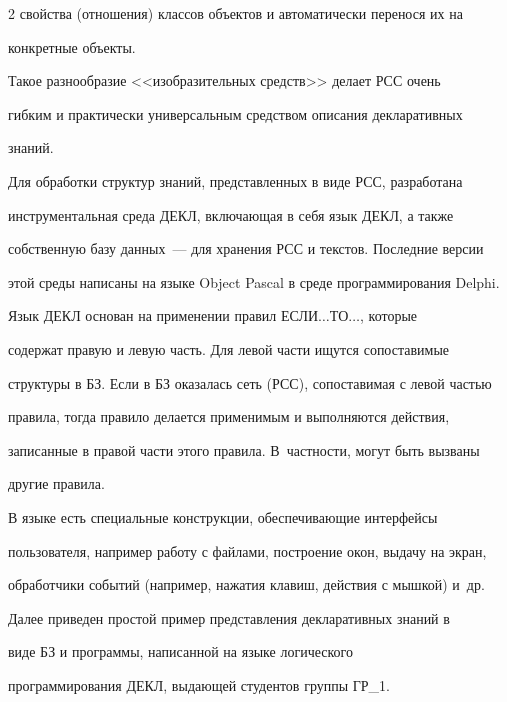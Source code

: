 \begin{multicols}{2}
свойства (отношения) классов объектов и автоматически перенося их на


конкретные объекты.











 Такое разнообразие <<изобразительных средств>> делает РСС очень


гибким и практически универсальным средством описания декларативных


знаний.





 Для обработки структур знаний, представленных в виде РСС, разработана


инструментальная среда ДЕКЛ, включающая в себя язык ДЕКЛ, а также


собственную базу данных~--- для хранения РСС и текстов. Последние версии


этой среды написаны на языке Object Pascal в среде программирования Delphi.


Язык ДЕКЛ основан на применении правил ЕСЛИ$\ldots$ТО$\ldots$, которые


содержат правую и левую часть. Для левой части ищутся сопоставимые


структуры в БЗ. Если в БЗ оказалась сеть (РСС), сопоставимая с левой частью


правила, тогда правило делается применимым и выполняются действия,


записанные в правой части этого правила. В~частности, могут быть вызваны


другие правила.





 В языке есть специальные конструкции, обеспечивающие интерфейсы


пользователя, например работу с файлами, построение окон, выдачу на экран,


обработчики событий (например, нажатия клавиш, действия с мышкой) и~др.





 Далее приведен простой пример представления декларативных знаний в


виде БЗ и программы, написанной на языке логического


программирования ДЕКЛ, выдающей студентов группы ГР\_1.






\end{multicols}
